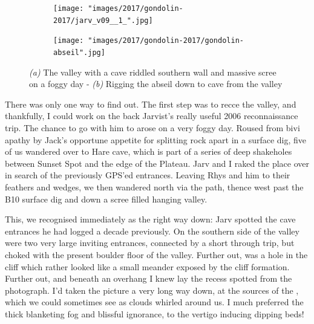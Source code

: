 \begin{figure}[t!]
\checkoddpage \ifoddpage \forcerectofloat \else \forceversofloat \fi
\centering
    \begin{subfigure}[t]{0.52\textwidth}
        \centering
         \texttt{[image: "images/2017/gondolin-2017/jarv\_v09\_\_1\_".jpg]}
        
        \caption{} \label{V09 valley}
    \end{subfigure}
    \hfill
    \begin{subfigure}[t]{0.46\textwidth}
    \centering
        \texttt{[image: "images/2017/gondolin-2017/gondolin-abseil".jpg]}
        \caption{} \label{gondolin abseil}
    \end{subfigure}
    \caption{
    \textit{(a)} The \protect{} valley with a cave riddled southern wall and massive scree on a foggy day -
     \textit{(b)} Rigging the abseil down to  cave from the \protect{} valley }
\end{figure}


There was only one way to find out. The first step was to recce the valley, and thankfully, I could work on the back Jarvist's really useful 2006 reconnaissance trip. The chance to go with him to  arose on a very foggy day. Roused from bivi apathy by Jack's opportune appetite for splitting rock apart in a surface dig, five of us wandered over to Hare cave, which is part of a series of deep shakeholes between Sunset Spot and the edge of the Plateau. Jarv and I raked the place over in search of the previously GPS'ed entrances. Leaving Rhys and him to their feathers and wedges, we then wandered north via the  path, thence west past the B10 surface dig and down a scree filled hanging valley.

This, we recognised immediately as the right way down: Jarv spotted the cave entrances he had logged a decade previously. On the southern side of the valley were two very large inviting entrances, connected by a short through trip, but choked with the present boulder floor of the valley. Further out, was a hole in the cliff which rather looked like a small meander exposed by the cliff formation. Further out, and beneath an overhang I knew lay the recess spotted from the photograph. I'd taken the picture a very long way down, at the sources of the , which we could sometimes see as clouds whirled around us. I much preferred the thick blanketing fog and blissful ignorance, to the vertigo inducing dipping beds!

